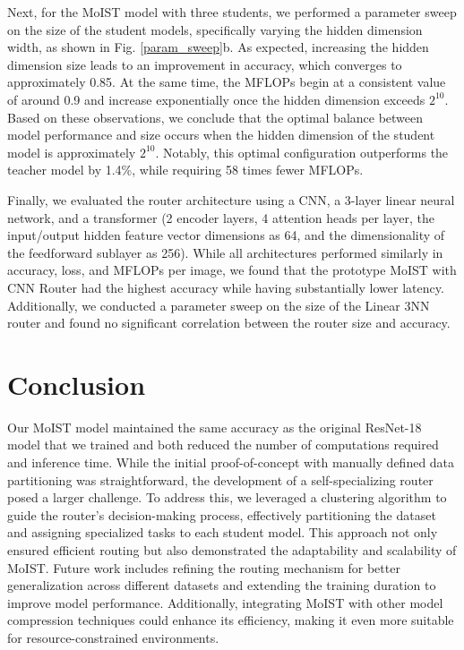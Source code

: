 \documentclass[conference]{IEEEtran}
\begin{document}
Next, for the MoIST model with three students, we performed a parameter sweep on the size of the student models, specifically varying the hidden dimension width, as shown in Fig. \ref{param_sweep}b. As expected, increasing the hidden dimension size leads to an improvement in accuracy, which converges to approximately 0.85. At the same time, the MFLOPs begin at a consistent value of around 0.9 and increase exponentially once the hidden dimension exceeds $2^{10}$. Based on these observations, we conclude that the optimal balance between model performance and size occurs when the hidden dimension of the student model is approximately $2^{10}$. Notably, this optimal configuration outperforms the teacher model by 1.4\%, while requiring 58 times fewer MFLOPs.

Finally, we evaluated the router architecture using a CNN, a 3-layer linear neural network, and a transformer (2 encoder layers, 4 attention heads per layer, the input/output hidden feature vector dimensions as 64, and the dimensionality of the feedforward sublayer as 256). While all architectures performed similarly in accuracy, loss, and MFLOPs per image, we found that the prototype MoIST with CNN Router had the highest accuracy while having substantially lower latency. Additionally, we conducted a parameter sweep on the size of the Linear 3NN router and found no significant correlation between the router size and accuracy.

\section{Conclusion}

Our MoIST model maintained the same accuracy as the original ResNet-18 model that we trained and both reduced the number of computations required and inference time. While the initial proof-of-concept with manually defined data partitioning was straightforward, the development of a self-specializing router posed a larger challenge. To address this, we leveraged a clustering algorithm to guide the router's decision-making process, effectively partitioning the dataset and assigning specialized tasks to each student model. This approach not only ensured efficient routing but also demonstrated the adaptability and scalability of MoIST. Future work includes refining the routing mechanism for better generalization across different datasets and extending the training duration to improve model performance. Additionally, integrating MoIST with other model compression techniques could enhance its efficiency, making it even more suitable for resource-constrained environments.
\end{document}
